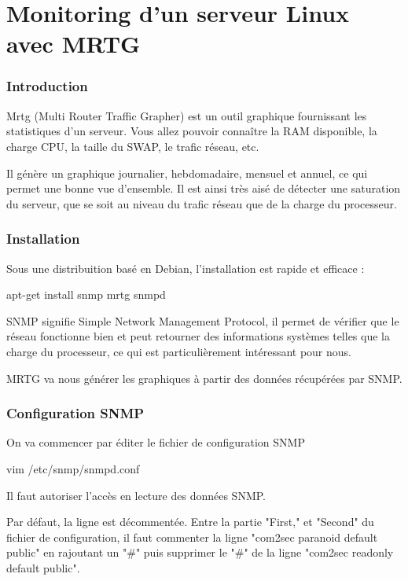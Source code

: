 \vfill \pagebreak
\part{Monitoring d'un serveur Linux avec MRTG}

\section{Introduction}

Mrtg (Multi Router Traffic Grapher) est un outil graphique fournissant les statistiques d'un serveur. Vous allez pouvoir connaître la RAM disponible, la charge CPU, la taille du SWAP, le trafic réseau, etc.

Il génère un graphique journalier, hebdomadaire, mensuel et annuel, ce qui permet une bonne vue d'ensemble. Il est ainsi très aisé de détecter une saturation du serveur, que se soit au niveau du trafic réseau que de la charge du processeur.

\section{Installation}

Sous une distribuition basé en Debian, l'installation est rapide et efficace :

apt-get install snmp mrtg snmpd

SNMP signifie Simple Network Management Protocol, il permet de vérifier que le réseau fonctionne bien et peut retourner des informations systèmes telles que la charge du processeur, ce qui est particulièrement intéressant pour nous.

MRTG va nous générer les graphiques à partir des données récupérées par SNMP.


\section{Configuration SNMP}

On va commencer par éditer le fichier de configuration SNMP

vim /etc/snmp/snmpd.conf


Il faut autoriser l'accès en lecture des données SNMP.

Par défaut, la ligne est décommentée. Entre la partie "First," et "Second" du fichier de configuration, il faut commenter la ligne "com2sec paranoid default public" en rajoutant un "#" puis supprimer le "#" de la ligne "com2sec readonly default public".

